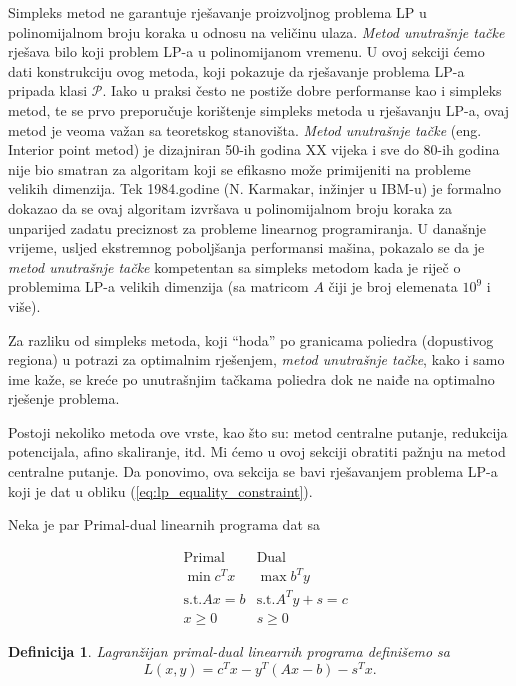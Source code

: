 \documentclass[a4paper, utf8, 11pt, colorlinks]{book}
\newtheorem{definition}{Definicija}
\begin{document}
Simpleks metod ne garantuje   rješavanje proizvoljnog problema LP u polinomijalnom broju koraka u odnosu na veličinu ulaza. %
\emph{Metod unutrašnje tačke} rješava bilo koji problem LP-a  u polinomijanom vremenu. U ovoj sekciji ćemo dati konstrukciju ovog metoda, koji pokazuje da rješavanje problema LP-a pripada klasi $\mathcal{P}$. Iako u praksi često ne postiže dobre  performanse kao i simpleks metod, te se  prvo  preporučuje korištenje simpleks metoda u rješavanju LP-a, ovaj metod je veoma važan sa teoretskog stanovišta.  \emph{Metod unutrašnje tačke} (eng. Interior point metod) je dizajniran 50-ih godina XX vijeka i sve do 80-ih godina nije bio smatran za algoritam koji se efikasno može primijeniti na probleme velikih dimenzija. Tek 1984.godine (N. Karmakar, inžinjer u IBM-u) je formalno dokazao da se ovaj algoritam izvršava u polinomijalnom broju koraka za unparijed zadatu preciznost za probleme linearnog programiranja. U današnje vrijeme, usljed ekstremnog poboljšanja performansi mašina, pokazalo se da je \emph{metod unutrašnje tačke} kompetentan sa simpleks metodom kada je riječ o problemima LP-a  velikih dimenzija (sa matricom $A$ čiji je broj elemenata $10^9$ i više).

Za razliku od simpleks metoda, koji ``hoda'' po granicama poliedra (dopustivog regiona) u potrazi za optimalnim rješenjem, \emph{metod unutrašnje tačke}, kako i samo ime kaže, se kreće po unutrašnjim tačkama poliedra  dok ne naiđe na optimalno rješenje problema. 

Postoji nekoliko metoda ove vrste, kao što su: metod centralne putanje, redukcija potencijala, afino skaliranje, itd. Mi ćemo u ovoj sekciji obratiti pažnju na metod centralne putanje. Da ponovimo, ova sekcija se bavi rješavanjem problema LP-a koji je dat u obliku (\ref{eq:lp_equality_constraint}). 

Neka je par Primal-dual linearnih programa dat sa

$$ \begin{array}{lll}
	&\mbox{Primal}            & \mbox{Dual}     \\
	&\min  c^T x              & \max  b^T y \\
	& \mbox{s.t.} Ax = b      &   \mbox{s.t.} A^Ty + s = c \\
	& x \geq 0                &   s \geq 0
\end{array}
$$
\begin{definition}
Lagranžijan primal-dual linearnih programa definišemo sa 
\begin{equation}
	L(x,y) = c^Tx - y^T(Ax - b) - s^T x.
\end{equation}
\end{definition}
\end{document}
